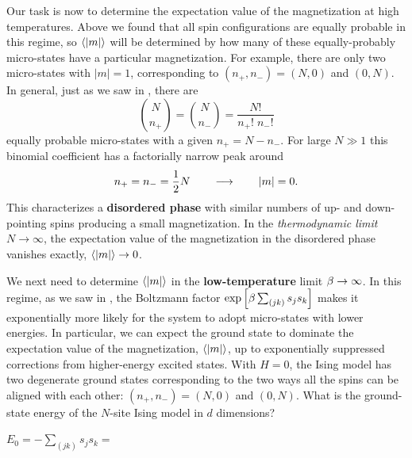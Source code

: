 Our task is now to determine the expectation value of the magnetization at high temperatures.
Above we found that all spin configurations are equally probable in this regime, so $\left\langle |m| \right\rangle$ will be determined by how many of these equally-probably micro-states have a particular magnetization.
For example, there are only two micro-states with $|m| = 1$, corresponding to $(n_+, n_-) = (N, 0)$ and $(0, N)$.
In general, just as we saw in , there are
\begin{equation*}
  \binom{N}{n_+} = \binom{N}{n_-} = \frac{N!}{n_+! \; n_-!}
\end{equation*}
equally probable micro-states with a given $n_+ = N - n_-$.
For large $N \gg 1$ this binomial coefficient has a factorially narrow peak around
\begin{equation*}
  n_+ = n_- = \frac{1}{2} N \qquad \longrightarrow \qquad |m| = 0.
\end{equation*}
This characterizes a \textbf{disordered phase} with similar numbers of up- and down-pointing spins producing a small magnetization.
In the \textit{thermodynamic limit} $N \to \infty$, the expectation value of the magnetization in the disordered phase vanishes exactly, $\left\langle |m| \right\rangle \to 0$.

We next need to determine $\left\langle |m| \right\rangle$ in the \textbf{low-temperature} limit $\beta \to \infty$.
In this regime, as we saw in , the Boltzmann factor $\exp\left[\beta\sum_{(jk)} s_j s_k\right]$ makes it exponentially more likely for the system to adopt micro-states with lower energies.
In particular, we can expect the ground state to dominate the expectation value of the magnetization, $\left\langle |m| \right\rangle$, up to exponentially suppressed corrections from higher-energy excited states.
With $H = 0$, the Ising model has two degenerate ground states corresponding to the two ways all the spins can be aligned with each other: $(n_+, n_-) = (N, 0)$ and $(0, N)$.
What is the ground-state energy of the $N$-site Ising model in $d$ dimensions?
\begin{mdframed}
  $\displaystyle E_0 = -\sum_{(jk)} s_j s_k = $ \\[50 pt]
\end{mdframed}

